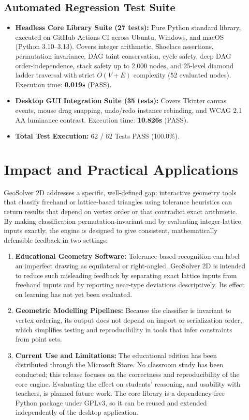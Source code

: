 \documentclass[preprint,12pt]{elsarticle}
\begin{document}
\subsection{Automated Regression Test Suite}
\begin{itemize}
    \item \textbf{Headless Core Library Suite (27 tests):} Pure Python standard library, executed on GitHub Actions CI across Ubuntu, Windows, and macOS (Python 3.10–3.13). Covers integer arithmetic, Shoelace assertions, permutation invariance, DAG taint conservation, cycle safety, deep DAG order-independence, stack safety up to 2,000 nodes, and 25-level diamond ladder traversal with strict $O(V+E)$ complexity (52 evaluated nodes). Execution time: \textbf{0.019s} (PASS).
    \item \textbf{Desktop GUI Integration Suite (35 tests):} Covers Tkinter canvas events, mouse drag snapping, undo/redo instance rebinding, and WCAG 2.1 AA luminance contrast. Execution time: \textbf{10.826s} (PASS).
    \item \textbf{Total Test Execution:} 62 / 62 Tests PASS (100.0\%).
\end{itemize}

\section{Impact and Practical Applications}

GeoSolver 2D addresses a specific, well-defined gap: interactive geometry tools that classify freehand or lattice-based triangles using tolerance heuristics can return results that depend on vertex order or that contradict exact arithmetic. By making classification permutation-invariant and by evaluating integer-lattice inputs exactly, the engine is designed to give consistent, mathematically defensible feedback in two settings:

\begin{enumerate}
    \item \textbf{Educational Geometry Software:} Tolerance-based recognition can label an imperfect drawing as equilateral or right-angled. GeoSolver 2D is intended to reduce such misleading feedback by separating exact lattice inputs from freehand inputs and by reporting near-type deviations descriptively. Its effect on learning has not yet been evaluated.
    \item \textbf{Geometric Modelling Pipelines:} Because the classifier is invariant to vertex ordering, its output does not depend on import or serialization order, which simplifies testing and reproducibility in tools that infer constraints from point sets.
    \item \textbf{Current Use and Limitations:} The educational edition has been distributed through the Microsoft Store. No classroom study has been conducted; this release focuses on the correctness and reproducibility of the core engine. Evaluating the effect on students' reasoning, and usability with teachers, is planned future work. The core library is a dependency-free Python package under GPLv3, so it can be reused and extended independently of the desktop application.
\end{enumerate}
\end{document}
